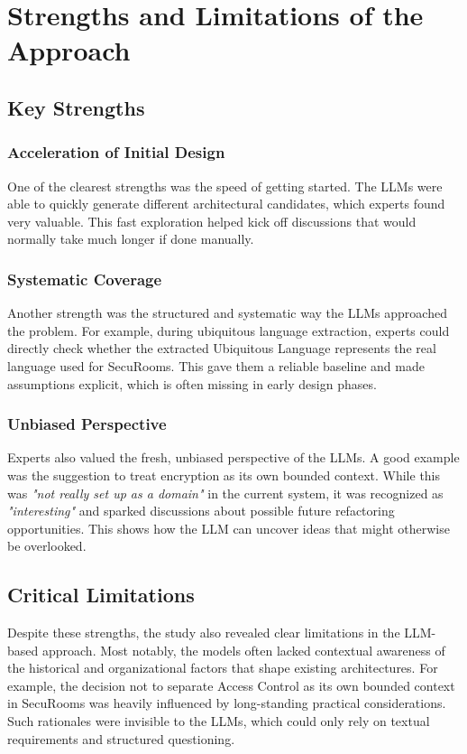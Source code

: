 \section{Strengths and Limitations of the Approach}

\subsection{Key Strengths}

\subsubsection{Acceleration of Initial Design}
One of the clearest strengths was the speed of getting started. The LLMs were able to quickly generate different architectural candidates, which experts found very valuable. This fast exploration helped kick off discussions that would normally take much longer if done manually.

\subsubsection{Systematic Coverage}
Another strength was the structured and systematic way the LLMs approached the problem. For example, during ubiquitous language extraction, experts could directly check whether the extracted Ubiquitous Language represents the real language used for SecuRooms. This gave them a reliable baseline and made assumptions explicit, which is often missing in early design phases.

\subsubsection{Unbiased Perspective}
Experts also valued the fresh, unbiased perspective of the LLMs. A good example was the suggestion to treat encryption as its own bounded context. While this was \textit{"not really set up as a domain"} in the current system, it was recognized as \textit{"interesting"} and sparked discussions about possible future refactoring opportunities. This shows how the LLM can uncover ideas that might otherwise be overlooked.

\subsection{Critical Limitations}

Despite these strengths, the study also revealed clear limitations in the LLM-based approach. Most notably, the models often lacked contextual awareness of the historical and organizational factors that shape existing architectures. For example, the decision not to separate Access Control as its own bounded context in SecuRooms was heavily influenced by long-standing practical considerations. Such rationales were invisible to the LLMs, which could only rely on textual requirements and structured questioning.


